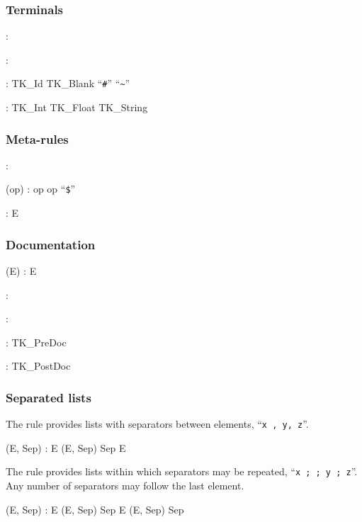 \subsubsection{Terminals}

: 
\Alt{} 

: 
\Alt{} 

: TK\_Id
\Alt{} TK\_Blank
\Alt{} ``\verb"#"''
\Alt{} ``\verb"~"''

: TK\_Int
\Alt{} TK\_Float
\Alt{} TK\_String

\subsubsection{Meta-rules}

:

(op)
: op
\Alt{} op ``\verb"$"'' 

:  
\Alt{} E

\subsubsection{Documentation}

(E)
:  E 

: 

: 

: 
\Alt{} TK\_PreDoc 

: 
\Alt{} TK\_PostDoc 

\subsubsection{Separated lists}

The rule  provides lists with separators between elements,
\eg{}  ``\verb"x , y, z"''.

(E, Sep)
: E
\Alt{} (E, Sep) Sep E

The rule  provides lists within which separators may
be repeated, \eg{}  ``\verb"x ; ; y ; z"''.
Any number of separators may follow the last element.

(E, Sep)
: E
\Alt{} (E, Sep) Sep E
\Alt{} (E, Sep) Sep

